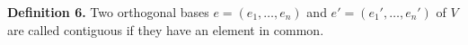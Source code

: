 \textbf{Definition 6.} Two orthogonal bases $e = (e_1, \ldots, e_n)$ and $e' = (e_1', \ldots, e_n')$ of $V$ are called contiguous if they have an element in common.
